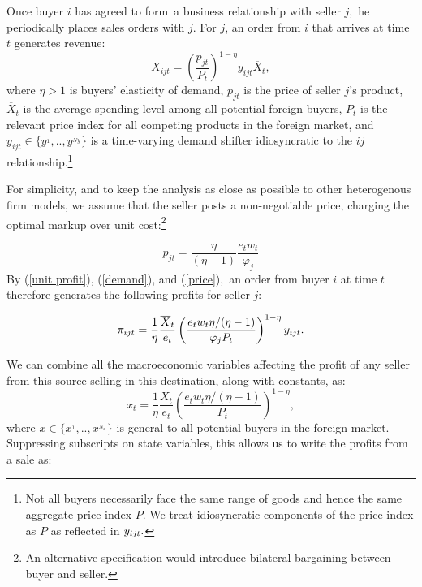 \documentclass[12pt]{article}
\begin{document}
Once buyer $i$ has agreed to form\ a business relationship with seller $j,$
he periodically places sales orders with $j$. For $j$, an order from $i$
that arrives at time $t$ generates revenue:%
\begin{equation}
X_{ijt}=\left( \frac{p_{jt}}{P_{t}}\right) ^{1-\eta }y_{ijt}\overline{X}_{t},
\label{demand}
\end{equation}%
where $\eta >1$ is buyers' elasticity of demand, $p_{jt}$ is the price of
seller $j$'s product, $\overline{X}_{t}$ is the average spending level among
all potential foreign buyers, $P_{t}$ is the relevant price index for all
competing products in the foreign market, and $y_{ijt}\in
\{y^{_{1}},..,y^{_{Ny}}\}$ is a time-varying demand shifter idiosyncratic to
the $ij$ relationship.\footnote{%
Not all buyers necessarily face the same range of goods and hence the same
aggregate price index $P$. We treat idiosyncratic components of the price
index as $P$ as reflected in $y_{ijt}.\medskip $}

For simplicity, and to keep the analysis as close as possible to other
heterogenous firm models, we assume that the seller posts a non-negotiable
price, charging the optimal markup over unit cost:\footnote{%
An alternative specification would introduce bilateral bargaining between
buyer and seller.\medskip}

\begin{equation}
p_{jt}=\frac{\eta }{(\eta -1)}\frac{e_{t}w_{t}}{\varphi _{j}}  \label{price}
\end{equation}%
By (\ref{unit profit}), (\ref{demand}), and (\ref{price}),\ an order from
buyer $i$ at time $t$ therefore generates the following profits for seller $%
j $:

\begin{equation*}
\pi _{ijt}=\frac{1}{\eta }\frac{\overline{X}_{t}}{e_{t}}\left( \frac{%
e_{t}w_{t}\eta /(\eta -1)}{\varphi _{j}P_{t}}\right) ^{1-\eta }y_{ijt}.
\end{equation*}

We can combine all the macroeconomic variables affecting the profit of any
seller from this source selling in this destination, along with constants,
as:%
\begin{equation*}
x_{t}=\frac{1}{\eta }\frac{\overline{X}_{t}}{e_{t}}\left( \frac{e_{t}w_{t}\eta
/(\eta -1)}{P_{t}}\right) ^{1-\eta },
\end{equation*}%
where $x\in \{x^{_{1}},..,x^{_{N_{x}}}\}$ is general to all potential buyers
in the foreign market. Suppressing subscripts on state variables, this
allows us to write the profits from a sale as:
\end{document}
